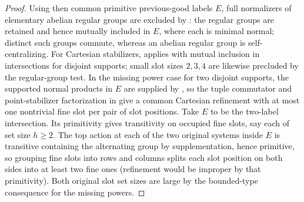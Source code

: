 \begin{proof}

Using then common primitive previous-good labels \(E\), full normalizers of elementary abelian regular
groups are excluded by : the regular groups are retained and hence mutually
included in \(E\), where each is minimal normal; distinct such groups commute, whereas an abelian regular
group is self-centralizing.  For Cartesian stabilizers,  applies with mutual
inclusion in intersections for disjoint supports; small slot sizes \(2,3,4\) are likewise precluded by
the regular-group test. In the missing power case for two disjoint supports, the supported normal
products in \(E\) are supplied by , so the tuple commutator and
point-stabilizer factorization in  give a common Cartesian refinement with
at most one nontrivial fine slot per pair of slot
positions. Take \(E\) to be the two-label intersection. Its primitivity gives transitivity on occupied
fine slots, say each of set size \(h\ge2\). The top action at each of the two original systems inside
\(E\) is transitive containing the alternating group by supplementation, hence primitive, so grouping
fine slots into rows and columns splits each slot position on both sides into at least two fine ones
(refinement would be improper by that primitivity). Both original slot set sizes are large by the
bounded-type consequence for the missing powers.


\end{proof}
